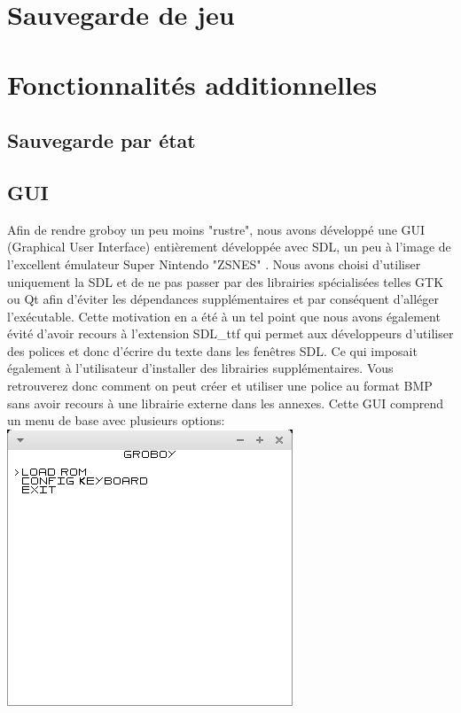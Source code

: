 \documentclass{report}
\begin{document}
\section{Sauvegarde de jeu}
\section{Fonctionnalités additionnelles}
\subsection{Sauvegarde par état}
\subsection{GUI}
Afin de rendre groboy un peu moins "rustre", nous avons développé une GUI (Graphical User Interface) entièrement développée avec SDL, un peu à l'image de l'excellent émulateur Super Nintendo "ZSNES" \cite{zsnes}. Nous avons choisi d'utiliser uniquement la SDL et de ne pas passer par des librairies spécialisées telles GTK ou Qt afin d'éviter les dépendances supplémentaires et par conséquent d'alléger l'exécutable. Cette motivation en a été à un tel point que nous avons également évité d'avoir recours à l'extension SDL\_ttf qui permet aux développeurs d'utiliser des polices et donc d'écrire du texte dans les fenêtres SDL. Ce qui imposait également à l'utilisateur d'installer des librairies supplémentaires. Vous retrouverez donc comment on peut créer et utiliser une police au format BMP sans avoir recours à une librairie externe dans les annexes. Cette GUI comprend un menu de base avec plusieurs options: \\ 
\includegraphics[scale=0.5]{images/screenshot_menu.png}\\
\end{document}
